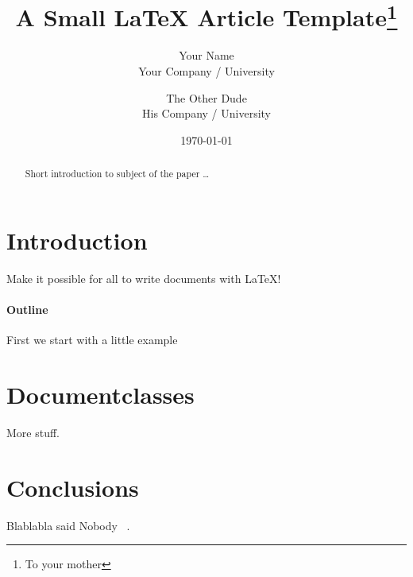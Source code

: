 \documentclass{article}
\title{A Small \LaTeX{} Article Template\thanks{To your mother}}
\author{Your Name \\
	Your Company / University  \\
	\and 
	The Other Dude \\
	His Company / University \\
	}
\date{\today}
\begin{document}
\maketitle

\begin{abstract}
Short introduction to subject of the paper \ldots 
\end{abstract}

\section{Introduction}
Make it possible for all to write documents with \LaTeX{}!

\paragraph{Outline}
First we start with a little example

\section{Documentclasses} \label{documentclasses}
More stuff.

\section{Conclusions}\label{conclusions}
Blablabla said Nobody ~\cite{PAKEMAN2019127}.

{}

\end{document}
